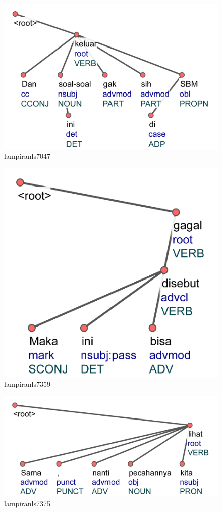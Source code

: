 \begin{figure}
	\centering \includegraphics[width=0.8
	\textwidth] {pics/lampiran/lampiranls7047.jpg} 
	\caption{lampiranls7047} 
	\label{fig:lampiranls7047} 
\end{figure}


\begin{figure}
	\centering \includegraphics[width=0.8
	\textwidth] {pics/lampiran/lampiranls7359.jpg} 
	\caption{lampiranls7359} 
	\label{fig:lampiranls7359} 
\end{figure}

\begin{figure}
	\centering \includegraphics[width=0.8
	\textwidth] {pics/lampiran/lampiranls7375.jpg} 
	\caption{lampiranls7375} 
	\label{fig:lampiranls7375} 
\end{figure}

